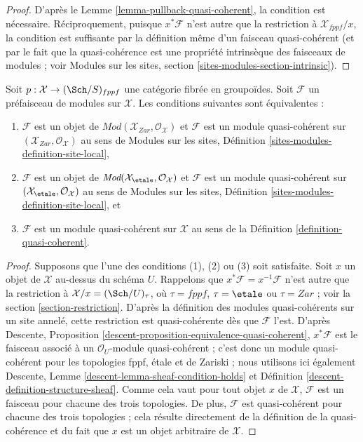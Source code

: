 \begin{proof}
D'après le
Lemme \ref{lemma-pullback-quasi-coherent},
la condition est nécessaire. Réciproquement, puisque $x^*\mathcal{F}$
n'est autre que la restriction à $\mathcal{X}_{fppf}/x$, la condition est
suffisante par la définition même d'un faisceau quasi-cohérent
(et par le fait que la quasi-cohérence est une propriété intrinsèque
des faisceaux de modules ; voir
Modules sur les sites, section \ref{sites-modules-section-intrinsic}).
\end{proof}

\begin{lemma}
\label{lemma-characterize-quasi-coherent-bis}
Soit $p : \mathcal{X} \to (\Sch/S)_{fppf}$ une catégorie
fibrée en groupoïdes. Soit $\mathcal{F}$ un préfaisceau de
modules sur $\mathcal{X}$. Les conditions suivantes sont équivalentes :
\begin{enumerate}
\item $\mathcal{F}$ est un objet de
$\textit{Mod}(\mathcal{X}_{Zar}, \mathcal{O}_\mathcal{X})$
et $\mathcal{F}$ est un module quasi-cohérent sur
$(\mathcal{X}_{Zar}, \mathcal{O}_\mathcal{X})$ au sens de
Modules sur les sites, Définition \ref{sites-modules-definition-site-local},
\item $\mathcal{F}$ est un objet de
$\textit{Mod}(\mathcal{X}_\etale, \mathcal{O}_\mathcal{X})$
et $\mathcal{F}$ est un module quasi-cohérent sur
$(\mathcal{X}_\etale, \mathcal{O}_\mathcal{X})$ au sens de
Modules sur les sites, Définition \ref{sites-modules-definition-site-local}, et
\item $\mathcal{F}$ est un module quasi-cohérent sur $\mathcal{X}$
au sens de la Définition \ref{definition-quasi-coherent}.
\end{enumerate}
\end{lemma}

\begin{proof}
Supposons que l'une des conditions (1), (2) ou (3) soit satisfaite.
Soit $x$ un objet de $\mathcal{X}$ au-dessus du schéma $U$.
Rappelons que $x^*\mathcal{F} = x^{-1}\mathcal{F}$ n'est autre que la
restriction à $\mathcal{X}/x = (\Sch/U)_\tau$, où
$\tau = fppf$, $\tau = \etale$ ou $\tau = Zar$ ; voir la
section \ref{section-restriction}.
D'après la définition des modules quasi-cohérents sur un site annelé,
cette restriction est quasi-cohérente dès que $\mathcal{F}$ l'est.
D'après Descente, Proposition \ref{descent-proposition-equivalence-quasi-coherent},
$x^*\mathcal{F}$ est le faisceau associé à
un $\mathcal{O}_U$-module quasi-cohérent ; c'est donc
un module quasi-cohérent pour les topologies fppf, \'etale et de
Zariski ; nous utilisons ici également
Descente, Lemme \ref{descent-lemma-sheaf-condition-holds} et
Définition \ref{descent-definition-structure-sheaf}.
Comme cela vaut pour tout objet $x$ de $\mathcal{X}$,
$\mathcal{F}$ est un faisceau pour chacune des trois topologies.
De plus, $\mathcal{F}$ est quasi-cohérent pour chacune
des trois topologies ; cela résulte directement de la définition de la
quasi-cohérence et du fait que $x$ est un objet arbitraire de $\mathcal{X}$.
\end{proof}







